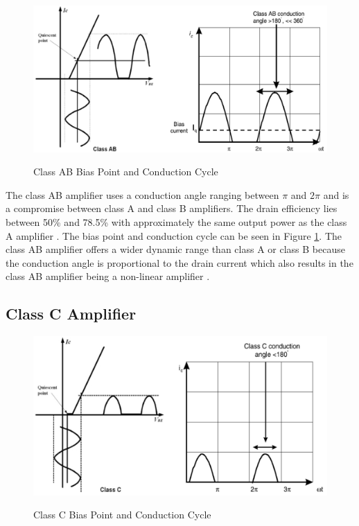 \begin{figure}
  \centering
  \includegraphics[width=6in]{figures/classes/classab_bias}\\
  \caption{Class AB Bias Point and Conduction Cycle \cite{Rosu2001}}\label{classab_bias}
\end{figure}

The class AB amplifier uses a conduction angle ranging between $\pi$ and $2\pi$ and is a compromise between class A and class B amplifiers. The drain efficiency lies between 50\% and 78.5\% with approximately the same output power as the class A amplifier \cite{C.Cripps2006}. The bias point and conduction cycle can be seen in Figure \ref{classab_bias}. The class AB amplifier offers a wider dynamic range than class A or class B because the conduction angle is proportional to the drain current which also results in the class AB amplifier being a non-linear amplifier \cite{C.Cripps2006}.

\subsection{Class C Amplifier}

\begin{figure}
  \centering
  \includegraphics[width=6in]{figures/classes/classc_bias}\\
  \caption{Class C Bias Point and Conduction Cycle \cite{Rosu2001}}\label{classc_bias}
\end{figure}

